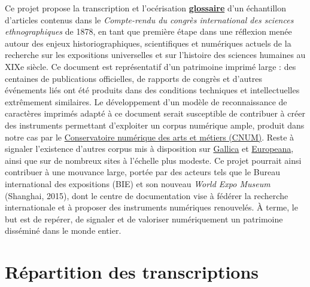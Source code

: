 \documentclass{article}
\begin{document}
	Ce projet propose la transcription et l'océrisation \textbf{\underline{glossaire}} d’un échantillon d’articles contenus dans le \textit{Compte-rendu du congrès international des sciences ethnographiques} de 1878, en tant que première étape dans une réflexion menée autour des enjeux historiographiques, scientifiques et numériques actuels de la recherche sur les expositions universelles et sur l’histoire des sciences humaines au XIXe siècle. Ce document est représentatif d’un patrimoine imprimé large : des centaines de publications officielles, de rapports de congrès et d’autres événements liés ont été produits dans des conditions techniques et intellectuelles extrêmement similaires. Le développement d’un modèle de reconnaissance de caractères imprimés adapté à ce document serait susceptible de contribuer à créer des instruments permettant d’exploiter un corpus numérique ample, produit dans notre cas par le \href{http://cnum.cnam.fr/thematiques/fr/1.expositions\_universelles/cata\_auteurs.php}{Conservatoire numérique des arts et métiers (CNUM)}. Reste à signaler l’existence d’autres corpus mis à disposition sur \href{https://gallica.bnf.fr/accueil/es/content/accueil-es?mode=desktop}{Gallica} et \href{https://www.europeana.eu/fr}{Europeana}, ainsi que sur de nombreux sites à l'échelle plus modeste. Ce projet pourrait ainsi contribuer à une mouvance large, portée par des acteurs tels que le Bureau international des expositions (BIE) et son nouveau \textit{World Expo Museum} (Shanghai, 2015), dont le centre de documentation vise à fédérer la recherche internationale et à proposer des instruments numériques renouvelés. À terme, le but est de repérer, de signaler et de valoriser numériquement un patrimoine disséminé dans le monde entier. 
	
	
	
	\section{Répartition des transcriptions}
	
\end{document}
